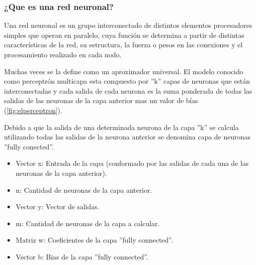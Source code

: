 \begin{figure}[!h]
\centering
 
\label{fig:elperceptron}
\end{figure}

\subsubsection{¿Que es una red neuronal?}

Una red neuronal es un grupo interconectado de distintos elementos procesadores simples que operan en paralelo, cuya función se determina a partir de distintas características de la red, su estructura, la fuerza o pesos en las conexiones y el procesamiento realizado en cada nodo.\par
Muchas veces se la define como un aproximador universal. El modelo conocido como perceptrón multicapa esta compuesto por ''k'' capas de neuronas que están interconectadas y cada salida de cada neurona es la suma ponderada de todas las salidas de las neuronas de la capa anterior mas un valor de bías (\autoref{fig:elperceptron}).

\begin{figure}[!h]
\centering
 
\label{fig:elperceptronmulticapa}
\end{figure}

Debido a que la salida de una determinada neurona de la capa ''k'' se calcula utilizando todas las salidas de la neurona anterior se denomina capa de neuronas ''fully conected''.\par

\begin{itemize}
    \item Vector x: Entrada de la capa (conformado por las salidas de cada una de las neuronas de la capa anterior).
    \item n: Cantidad de neuronas de la capa anterior.
    \item Vector y: Vector de salidas.
    \item m: Cantidad de neuronas de la capa a calcular.
    \item Matriz w: Coeficientes de la capa ''fully connected''.
    \item Vector b: Bias de la capa ''fully connected''.
\end{itemize}



